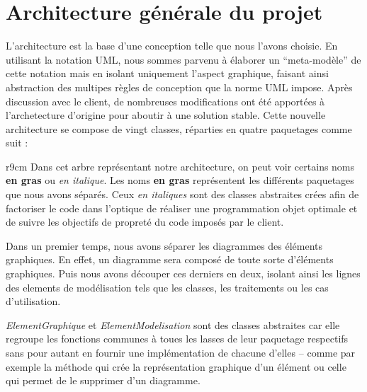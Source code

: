 \documentclass[12pt,a4paper,openany]{report}
\begin{document}
	\section{Architecture générale du projet}
		L'architecture est la base d'une conception telle que nous l'avons choisie. En utilisant la notation UML, 
		nous sommes parvenu à élaborer un ``meta-modèle'' de cette notation mais en isolant uniquement l'aspect 
		graphique, faisant ainsi abstraction des multipes règles de conception que la norme UML impose. Après 
		discussion avec le client, de nombreuses modifications ont été apportées à l'archetecture d'origine 
		pour aboutir à une solution stable. Cette nouvelle architecture se compose de vingt classes, réparties 
		en quatre paquetages comme suit :
	\newline
	\begin{wrapfigure}{r}{9cm}
		Dans cet arbre représentant notre architecture, on peut voir certains noms \textbf{en gras} ou \textit{en italique}. 
		Les noms \textbf{en gras} représentent les différents paquetages que nous avons séparés. Ceux \textit{en italiques} 
		sont des classes abstraites crées afin de factoriser le code dans l'optique de réaliser une programmation objet optimale 
		et de suivre les objectifs de propreté du code imposés par le client.\vspace{2px}
		
		Dans un premier temps, nous avons séparer les diagrammes des éléments graphiques. En effet, un diagramme sera composé de
		toute sorte d'éléments graphiques. Puis nous avons découper ces derniers en deux, isolant ainsi les lignes des elements
		de modélisation tels que les classes, les traitements ou les cas d'utilisation.\vspace{2px}
		
		\textit{ElementGraphique} et \textit{ElementModelisation} sont des classes abstraites car elle regroupe les fonctions communes
		à toues les lasses de leur paquetage respectifs sans pour autant en fournir une implémentation de chacune d'elles -- comme par exemple la méthode qui crée la
		représentation graphique d'un élément ou celle qui permet de le supprimer d'un diagramme.
	\end{wrapfigure}
\end{document}
